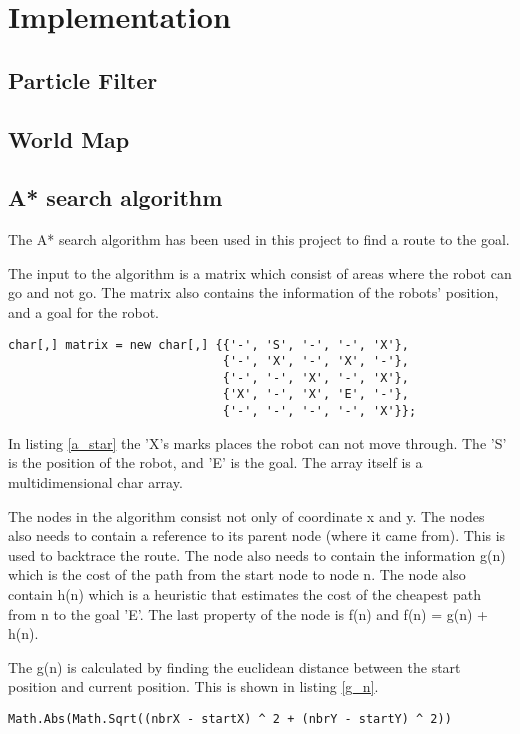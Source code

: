 \chapter{Implementation}
\label{chp:impl}

\section{Particle Filter}
\section{World Map}
\section{A* search algorithm}

The A* search algorithm has been used in this project to find a route to the goal. 

The input to the algorithm is a matrix which consist of areas where the robot  can go and not go. The matrix also contains the information of the robots' position, and a goal for the robot.

\begin{lstlisting}[caption={An example of the matrix which the A* uses as input.}, label=a_star]
char[,] matrix = new char[,] {{'-', 'S', '-', '-', 'X'},
							  {'-', 'X', '-', 'X', '-'},
							  {'-', '-', 'X', '-', 'X'},
							  {'X', '-', 'X', 'E', '-'},
							  {'-', '-', '-', '-', 'X'}};
\end{lstlisting}

In listing \ref{a_star} the 'X's marks places the robot can not move through. The 'S' is the position of the robot, and 'E' is the goal. The array itself is a multidimensional char array.

The nodes in the algorithm consist not only of coordinate x and y. The nodes also needs to contain a reference to its parent node (where it came from). This is used to backtrace the route. The node also needs to contain the information g(n) which is the cost of the path from the start node to node n. The node also contain h(n) which is a heuristic that estimates the cost of the cheapest path from n to the goal 'E'. The last property of the node is f(n) and f(n) = g(n) + h(n).

The g(n) is calculated by finding the euclidean distance between the start position and current position. This is shown in listing \ref{g_n}.

\begin{lstlisting}[caption={Calculation of g(n).}, label=g_n]
Math.Abs(Math.Sqrt((nbrX - startX) ^ 2 + (nbrY - startY) ^ 2))
\end{lstlisting}

